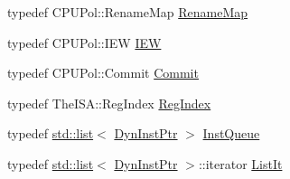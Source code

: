 \begin{DoxyCompactItemize}
\item 
typedef CPUPol::RenameMap \hyperlink{classDefaultRename_a341963bcea1928476182a17e357f98e3}{RenameMap}
\item 
typedef CPUPol::IEW \hyperlink{classDefaultRename_a2e298f790f528754f0e0ffa0cb8088f6}{IEW}
\item 
typedef CPUPol::Commit \hyperlink{classDefaultRename_a05a26def5ee77f19d25b86079d161ebd}{Commit}
\item 
typedef TheISA::RegIndex \hyperlink{classDefaultRename_a36d25e03e43fa3bb4c5482cbefe5e0fb}{RegIndex}
\item 
typedef \hyperlink{classstd_1_1list}{std::list}$<$ \hyperlink{classDefaultRename_a028ce10889c5f6450239d9e9a7347976}{DynInstPtr} $>$ \hyperlink{classDefaultRename_adba1ac227fff8c6f9b17ded2fb270e77}{InstQueue}
\item 
typedef \hyperlink{classstd_1_1list}{std::list}$<$ \hyperlink{classDefaultRename_a028ce10889c5f6450239d9e9a7347976}{DynInstPtr} $>$::iterator \hyperlink{classDefaultRename_a184cb829e22cc656acb41864f68f51ea}{ListIt}
\end{DoxyCompactItemize}
